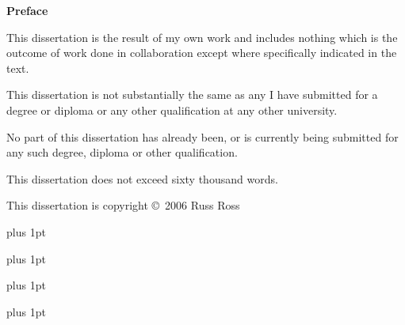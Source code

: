 \vspace*{\fill}

{\Huge \bf \noindent Preface}
\vspace{0.4in}

\noindent This dissertation is the result of my own work and
includes nothing which is the outcome of work done in collaboration
except where specifically indicated in the text.

\noindent This dissertation is not substantially the same as any I
have submitted for a degree or diploma or any other qualification at
any other university.

\noindent No part of this dissertation has already been, or is
currently being submitted for any such degree, diploma or other
qualification.

\noindent This dissertation does not exceed sixty thousand words.

\vspace{0.4in}

\noindent This dissertation is copyright \copyright~2006 Russ Ross

\cleardoublepage

%

{
  \parskip 0pt plus 1pt
  \tableofcontents
}

\cleardoublepage

%

{
  \parskip 0pt plus 1pt
  \listoffigures
}

\cleardoublepage

%

{
  \parskip 0pt plus 1pt
  \listoftables
}

\cleardoublepage

%

{
  \parskip 0pt plus 1pt
%  
}

\cleardoublepage

%

%  

